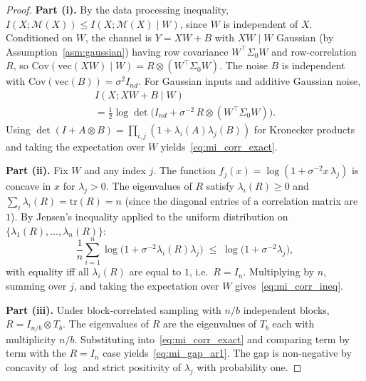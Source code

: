 \documentclass[letterpaper]{article} %
\begin{document}
\begin{proof}
\textbf{Part (i).}
By the data processing inequality,
$I(X;\mathcal{M}(X)) \le I(X;\mathcal{M}(X) \mid W)$, since $W$
is independent of $X$.  Conditioned on $W$, the channel is
$Y = XW + B$ with $XW \mid W$ Gaussian (by
Assumption~\ref{asm:gaussian}) having row covariance
$W^\top\!\Sigma_0 W$ and row-correlation $R$, so
$\mathrm{Cov}(\mathrm{vec}(XW) \mid W) = R \otimes (W^\top\!\Sigma_0 W)$.
The noise $B$ is independent with
$\mathrm{Cov}(\mathrm{vec}(B)) = \sigma^2 I_{nd}$.  For Gaussian
inputs and additive Gaussian noise,
\begin{multline*}
I(X; XW{+}B \mid W)
\\
= \tfrac{1}{2}\log\det\!\bigl(I_{nd} + \sigma^{-2}\,
  R \otimes (W^\top\!\Sigma_0 W)\bigr).
\end{multline*}
Using $\det(I + A \otimes B) = \prod_{i,j}(1 + \lambda_i(A)\lambda_j(B))$
for Kronecker products and taking the expectation over $W$ yields~\eqref{eq:mi_corr_exact}.

\textbf{Part (ii).}
Fix $W$ and any index $j$.  The function
$f_j(x) = \log(1 + \sigma^{-2}x\,\lambda_j)$ is concave in $x$
for $\lambda_j > 0$.  The eigenvalues of $R$ satisfy
$\lambda_i(R) \ge 0$ and $\sum_i \lambda_i(R) = \mathrm{tr}(R) = n$
(since the diagonal entries of a correlation matrix are~$1$).  By
Jensen's inequality applied to the uniform distribution on
$\{\lambda_1(R),\ldots,\lambda_n(R)\}$:
\[
\frac{1}{n}\sum_{i=1}^{n}
  \log\!\bigl(1 + \sigma^{-2}\lambda_i(R)\lambda_j\bigr)
\;\le\;
\log\!\bigl(1 + \sigma^{-2}\lambda_j\bigr),
\]
with equality iff all $\lambda_i(R)$ are equal to $1$, i.e.\
$R = I_n$.  Multiplying by $n$, summing over $j$, and taking the
expectation over $W$ gives~\eqref{eq:mi_corr_ineq}.

\textbf{Part (iii).}
Under block-correlated sampling with $n/b$ independent blocks,
$R = I_{n/b} \otimes T_b$.  The eigenvalues of $R$ are the
eigenvalues of $T_b$ each with multiplicity $n/b$.  
Substituting into~\eqref{eq:mi_corr_exact} and comparing term
by term with the $R = I_n$ case yields~\eqref{eq:mi_gap_ar1}.
The gap is non-negative by concavity of $\log$ and strict
positivity of $\lambda_j$ with probability one.
\end{proof}
\end{document}

